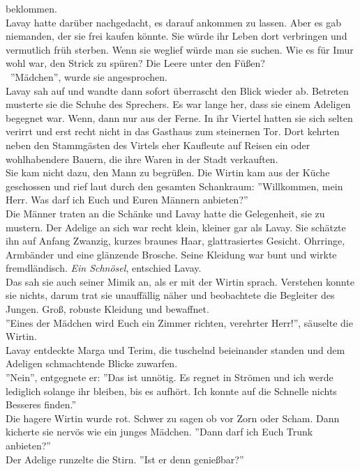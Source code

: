 beklommen.\\ 
Lavay hatte darüber nachgedacht, es darauf ankommen zu lassen. Aber es gab niemanden, 
der sie frei kaufen könnte. Sie würde ihr Leben dort verbringen und vermutlich früh sterben. Wenn 
sie weglief würde man sie suchen. Wie es für Imur wohl war, den Strick zu spüren? Die Leere unter 
den Füßen?\\\
''Mädchen'', wurde sie angesprochen.\\
Lavay sah auf und wandte dann sofort überrascht den Blick wieder ab. Betreten musterte sie die 
Schuhe des Sprechers. Es war lange her, dass sie einem Adeligen begegnet war. Wenn, dann nur aus 
der Ferne. In ihr Viertel hatten sie sich selten verirrt und erst recht nicht in das Gasthaus zum 
steinernen Tor. Dort kehrten neben den Stammgästen des Virtels eher Kaufleute auf Reisen ein oder 
wohlhabendere Bauern, die ihre Waren in der Stadt verkauften.\\
Sie kam nicht dazu, den Mann zu begrüßen. Die Wirtin kam aus der Küche geschossen und rief laut 
durch den gesamten Schankraum: ''Willkommen, mein Herr. Was darf ich Euch und Euren Männern 
anbieten?''\\
Die Männer traten an die Schänke und Lavay hatte die Gelegenheit, sie zu mustern. Der Adelige an 
sich war recht klein, kleiner gar als Lavay. Sie schätzte ihn auf Anfang Zwanzig, kurzes braunes 
Haar, glattrasiertes Gesicht. Ohrringe, Armbänder und eine glänzende Brosche. Seine Kleidung war 
bunt und wirkte fremdländisch. \textit{Ein Schnösel}, entschied Lavay.\\Das sah sie auch seiner 
Mimik an, als er mit der Wirtin sprach. Verstehen konnte sie nichts, darum trat sie unauffällig 
näher und beobachtete die Begleiter des Jungen. Groß, robuste Kleidung und bewaffnet.\\
''Eines der Mädchen wird Euch ein Zimmer richten, verehrter Herr!'', säuselte die Wirtin.\\
Lavay entdeckte Marga und Terim, die tuschelnd beieinander standen und dem Adeligen schmachtende 
Blicke zuwarfen. \\
''Nein'', entgegnete er: ''Das ist unnötig. Es regnet in Strömen und ich werde lediglich 
solange ihr bleiben, bis es aufhört. Ich konnte auf die Schnelle nichts Besseres finden.''\\
Die hagere Wirtin wurde rot. Schwer zu sagen ob vor Zorn oder Scham. Dann kicherte sie nervös wie 
ein junges Mädchen. ''Dann darf ich Euch Trunk anbieten?''\\
Der Adelige runzelte die Stirn. ''Ist er denn genießbar?''\\
